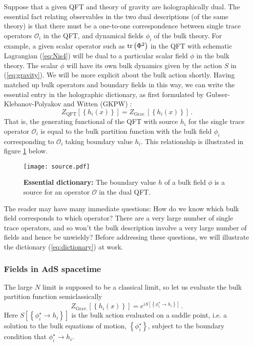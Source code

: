 \documentclass[10pt, oneside]{book}
\def\be{\begin{equation}}
\def\ee{\end{equation}}
\newcommand{\tr}{{\rm tr} }
\def\ocal{{\mathcal{O}}}
\begin{document}
\begin{doublespace}
Suppose that a given QFT and theory of gravity are holographically dual. The essential fact relating observables in the two dual descriptions (of the same theory) is that there must be a one-to-one correspondence between single trace operators $\ocal_i$ in the QFT, and dynamical fields $\phi_i$ of the bulk theory. For example, a given scalar operator such as $\tr \left( \Phi^2 \right)$ in the QFT with schematic Lagrangian (\ref{eq:Nis4}) will be dual to a particular scalar field $\phi$ in the bulk theory. The scalar $\phi$ will have its own bulk dynamics given by the action $S$ in (\ref{eq:gravity}). We will be more explicit about the bulk action shortly. Having matched up bulk operators and boundary fields in this way, we can write the essential entry in the holographic dictionary, as first formulated by Gubser-Klebanov-Polyakov and Witten (GKPW) \cite{Witten:1998qj, Gubser:1998bc}:
\be\label{eq:dictionary}
Z_\text{QFT}[\left\{h_i(x)\right\}] = Z_\text{Grav.}[\left\{h_i(x)\right\}] \,.
\ee
That is, the generating functional of the QFT with source $h_i$ for the single trace operator $\ocal_i$ is equal to the bulk partition function with the bulk field $\phi_i$ corresponding to $\ocal_i$ taking boundary value $h_i$. This relationship is illustrated in figure \ref{fig:source} below.
\begin{figure}[h]
\centering
\texttt{[image: source.pdf]}
\caption{\label{fig:source} {\bf Essential dictionary:} The boundary value $h$ of a bulk field $\phi$ is a source for an operator $\ocal$ in the dual QFT.}
\end{figure}

The reader may have many immediate questions: How do we know which bulk field corresponds to which operator? There are a very large number of single trace operators, and so won't the bulk description involve a very large number of fields and hence be unwieldy? Before addressing these questions, we will illustrate the dictionary (\ref{eq:dictionary}) at work.

\subsubsection{Fields in AdS spacetime}

The large $N$ limit is supposed to be a classical limit, so let us evaluate the bulk partition function semiclassically
\be\label{eq:classicalsource}
Z_\text{Grav.}[\left\{h_i(x)\right\}] = e^{i S\left[\left\{\phi^\star_i \to h_i \right\}\right]} \,.
\ee
Here $S[\left\{\phi^\star_i \to h_i \right\}]$ is the bulk action evaluated on a saddle point, i.e. a solution to the bulk equations of motion, $\left\{\phi^\star_i\right\}$, subject to the boundary condition that $\phi^\star_i \to h_i$.


\end{doublespace}
\end{document}
